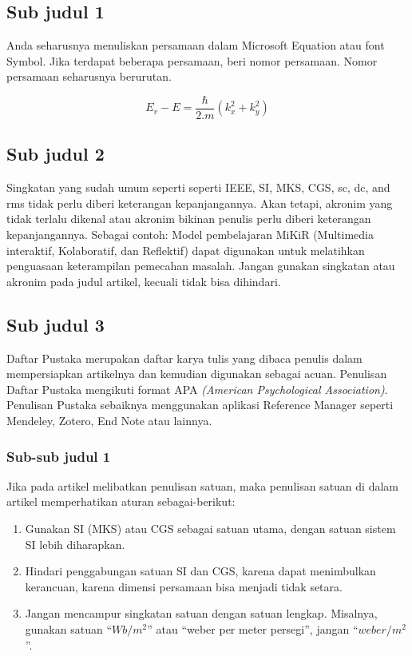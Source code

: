 \documentclass{iaesarticle-progres}
\begin{document}
\subsection{Sub judul 1}
Anda seharusnya menuliskan persamaan dalam Microsoft Equation atau font Symbol. Jika terdapat beberapa persamaan, beri nomor persamaan. Nomor persamaan seharusnya berurutan.

\begin{equation}
E_v - E = \frac{\hbar}{2.m}(k_x^2 + k_y^2)
\end{equation}
\vspace{.005em}

\subsection{Sub judul 2}
Singkatan yang sudah umum seperti seperti IEEE, SI, MKS, CGS, sc, dc, and rms tidak perlu diberi keterangan kepanjangannya. Akan tetapi, akronim yang tidak terlalu dikenal atau akronim bikinan penulis perlu diberi keterangan kepanjangannya. Sebagai contoh: Model pembelajaran MiKiR (Multimedia interaktif, Kolaboratif, dan Reflektif) dapat digunakan untuk melatihkan penguasaan keterampilan pemecahan masalah. Jangan gunakan singkatan atau akronim pada judul artikel, kecuali tidak bisa dihindari.

\subsection{Sub judul 3}
Daftar Pustaka merupakan daftar karya tulis yang dibaca penulis dalam mempersiapkan artikelnya dan kemudian digunakan sebagai acuan. Penulisan Daftar Pustaka mengikuti format APA \textit{(American Psychological Association)}. Penulisan Pustaka sebaiknya menggunakan aplikasi Reference Manager seperti Mendeley, Zotero, End Note atau lainnya.

\subsubsection {Sub-sub judul 1}
Jika pada artikel melibatkan penulisan satuan, maka penulisan satuan di dalam artikel memperhatikan aturan sebagai-berikut:
\begin{enumerate}[label=\alph*]
    \item Gunakan SI (MKS) atau CGS sebagai satuan utama, dengan satuan sistem SI lebih diharapkan.
    \item Hindari penggabungan satuan SI dan CGS, karena dapat menimbulkan kerancuan, karena dimensi persamaan bisa menjadi tidak setara.
    \item Jangan mencampur singkatan satuan dengan satuan lengkap. Misalnya, gunakan satuan “\(Wb/m^{2}\)” atau “weber per meter persegi”, jangan “\(weber/m^{2}\)”.
\end{enumerate}
\end{document}
